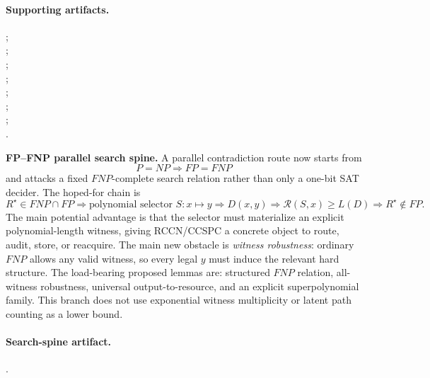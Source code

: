 \documentclass[11pt]{article}
\begin{document}
\paragraph{Supporting artifacts.}
;\\
;\\
;\\
;\\
;\\
;\\
;\\
.
\begin{candidatebox}
\textbf{FP--FNP parallel search spine.}
A parallel contradiction route now starts from
\[
P=NP\Longrightarrow FP=FNP
\]
and attacks a fixed \(FNP\)-complete search relation rather than only a one-bit SAT decider.
The hoped-for chain is
\[
R^\star\in FNP\cap FP
\Longrightarrow
\text{polynomial selector }S:x\mapsto y
\Longrightarrow
D(x,y)
\Longrightarrow
\mathcal R(S,x)\ge L(D)
\Longrightarrow
R^\star\notin FP.
\]
The main potential advantage is that the selector must materialize an explicit polynomial-length
witness, giving RCCN/CCSPC a concrete object to route, audit, store, or reacquire. The main new
obstacle is \emph{witness robustness}: ordinary \(FNP\) allows any valid witness, so every legal
\(y\) must induce the relevant hard structure. The load-bearing proposed lemmas are:
structured \(FNP\) relation, all-witness robustness, universal output-to-resource, and an explicit
superpolynomial family. This branch does not use exponential witness multiplicity or latent path
counting as a lower bound.

\paragraph{Search-spine artifact.}
.
\end{candidatebox}
\end{document}
